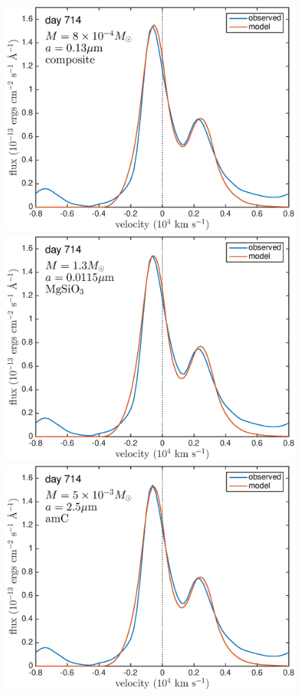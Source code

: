 \documentclass[useAMS,usenatbib,usegraphicx]{mnras}
\begin{document}
\begin{figure}
\includegraphics[trim =0 0 0 -25,clip=true,scale=0.25]{silicates_take2/OI/composit_bestfit}
\includegraphics[trim =25 0 0 -25,clip=true,scale=0.25]{silicates_take2/OI/MgSiO3_bestfit}
\includegraphics[trim =25 0 0 -25,clip=true,scale=0.25]{silicates_take2/OI/AmC_bestfit}

\end{figure}
\end{document}
